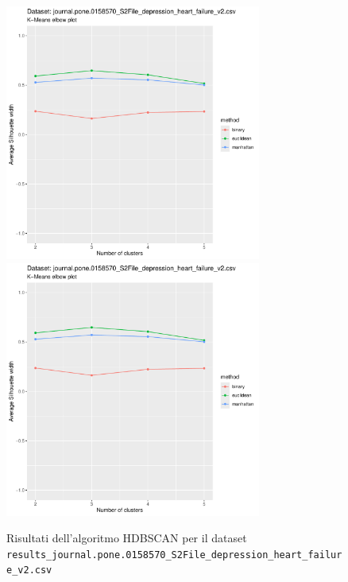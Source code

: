 \documentclass[12pt]{report}
\begin{document}
			\begin{figure}[h]
				\centering
				\includegraphics[width = 0.75\textwidth, height = 0.45\textheight, page = 7]{
					results/results_journal.pone.0158570_S2File_depression_heart_failure_v2.csv.pdf
				}
				\includegraphics[width = 0.75\textwidth, height = 0.45\textheight, page = 8]{
					results/results_journal.pone.0158570_S2File_depression_heart_failure_v2.csv.pdf
				}
				\caption{Risultati dell'algoritmo HDBSCAN per il dataset
				\texttt{results\_journal.pone.0158570\_S2File\_depression\_heart\_failure\_v2.csv}}
				\label{fig:hdbscan1}
			\end{figure}
\end{document}
